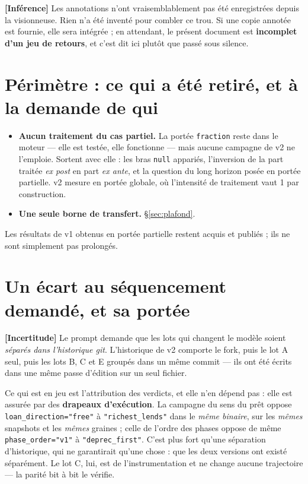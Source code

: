 \documentclass[11pt,a4paper]{article}
\newcommand{\code}[1]{\texttt{#1}}
\newcommand{\inference}{\textbf{[Inférence]}}
\newcommand{\incertitude}{\textbf{[Incertitude]}}
\begin{document}
\inference{} Les annotations n'ont vraisemblablement pas été enregistrées
depuis la visionneuse. Rien n'a été inventé pour combler ce trou. Si une copie
annotée est fournie, elle sera intégrée ; en attendant, le présent document est
\textbf{incomplet d'un jeu de retours}, et c'est dit ici plutôt que passé sous
silence.

\section{Périmètre : ce qui a été retiré, et à la demande de qui}

\begin{itemize}
\item \textbf{Aucun traitement du cas partiel.} La portée \code{fraction}
  reste dans le moteur --- elle est testée, elle fonctionne --- mais aucune
  campagne de v2 ne l'emploie. Sortent avec elle : les bras \code{null}
  appariés, l'inversion de la part traitée \emph{ex post} en part \emph{ex
  ante}, et la question du long horizon posée en portée partielle. v2 mesure en
  portée globale, où l'intensité de traitement vaut 1 par construction.
\item \textbf{Une seule borne de transfert.} §\ref{sec:plafond}.
\end{itemize}

Les résultats de v1 obtenus en portée partielle restent acquis et publiés ; ils
ne sont simplement pas prolongés.

\section{Un écart au séquencement demandé, et sa portée}

\incertitude{} Le prompt demande que les lots qui changent le modèle soient
\emph{séparés dans l'historique git}. L'historique de v2 comporte le fork, puis
le lot A seul, puis les lots B, C et E groupés dans un même commit --- ils ont
été écrits dans une même passe d'édition sur un seul fichier.

Ce qui est en jeu est l'attribution des verdicts, et elle n'en dépend pas :
elle est assurée par des \textbf{drapeaux d'exécution}. La campagne du sens du
prêt oppose \code{loan\_direction="free"} à \code{"richest\_lends"} dans le
\emph{même binaire}, sur les \emph{mêmes} snapshots et les \emph{mêmes}
graines ; celle de l'ordre des phases oppose de même
\code{phase\_order="v1"} à \code{"deprec\_first"}. C'est plus fort qu'une
séparation d'historique, qui ne garantirait qu'une chose : que les deux
versions ont existé séparément. Le lot C, lui, est de l'instrumentation et ne
change aucune trajectoire --- la parité bit à bit le vérifie.
\end{document}
